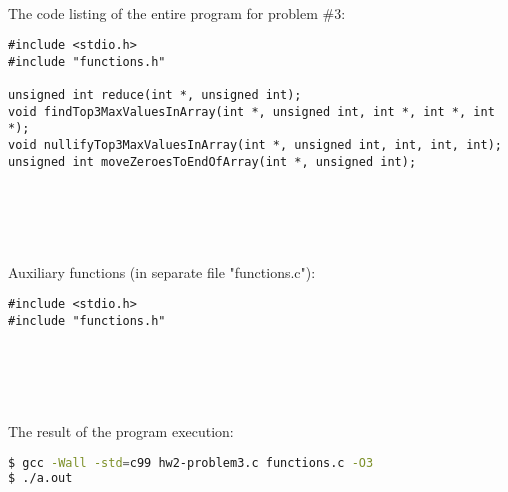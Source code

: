 \documentclass{article}
\begin{document}
\paragraph{}\	
\paragraph{}\
\paragraph{}\	

	
		\rmfamily
		\noindent The code listing of the entire program for problem \#3:
		\begin{verbatim}
#include <stdio.h>
#include "functions.h"

unsigned int reduce(int *, unsigned int);
void findTop3MaxValuesInArray(int *, unsigned int, int *, int *, int *);
void nullifyTop3MaxValuesInArray(int *, unsigned int, int, int, int);
unsigned int moveZeroesToEndOfArray(int *, unsigned int);
		\end{verbatim}
		
		
\paragraph{}\
\paragraph{}\

	\rmfamily
	\noindent Auxiliary functions (in separate file "functions.c"):	
	\begin{verbatim} 
#include <stdio.h>
#include "functions.h"
	\end{verbatim}
		
\paragraph{}\
\paragraph{}\
		
		\rmfamily
		\noindent The result of the program execution:
		
		\ttfamily
		\begin{lstlisting}[language=bash]
$ gcc -Wall -std=c99 hw2-problem3.c functions.c -O3
$ ./a.out
		\end{lstlisting}
		
\paragraph{}\	
\end{document}
